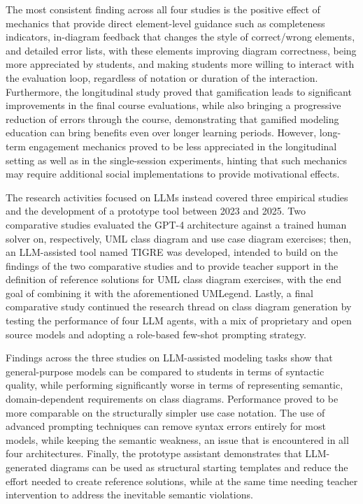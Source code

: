 The most consistent finding across all four studies is the positive effect of mechanics that provide direct element-level guidance such as completeness indicators, in-diagram feedback that changes the style of correct/wrong elements, and detailed error lists, with these elements improving diagram correctness, being more appreciated by students, and making students more willing to interact with the evaluation loop, regardless of notation or duration of the interaction. Furthermore, the longitudinal study proved that gamification leads to significant improvements in the final course evaluations, while also bringing a progressive reduction of errors through the course, demonstrating that gamified modeling education can bring benefits even over longer learning periods. However, long-term engagement mechanics proved to be less appreciated in the longitudinal setting as well as in the single-session experiments, hinting that such mechanics may require additional social implementations to provide motivational effects.

The research activities focused on LLMs instead covered three empirical studies and the development of a prototype tool between 2023 and 2025. Two comparative studies evaluated the GPT-4 architecture against a trained human solver on, respectively, UML class diagram and use case diagram exercises; then, an LLM-assisted tool named TIGRE was developed, intended to build on the findings of the two comparative studies and to provide teacher support in the definition of reference solutions for UML class diagram exercises, with the end goal of combining it with the aforementioned UMLegend. Lastly, a final comparative study continued the research thread on class diagram generation by testing the performance of four LLM agents, with a mix of proprietary and open source models and adopting a role-based few-shot prompting strategy.

Findings across the three studies on LLM-assisted modeling tasks show that general-purpose models can be compared to students in terms of syntactic quality, while performing significantly worse in terms of representing semantic, domain-dependent requirements on class diagrams. Performance proved to be more comparable on the structurally simpler use case notation. The use of advanced prompting techniques can remove syntax errors entirely for most models, while keeping the semantic weakness, an issue that is encountered in all four architectures. Finally, the prototype assistant demonstrates that LLM-generated diagrams can be used as structural starting templates and reduce the effort needed to create reference solutions, while at the same time needing teacher intervention to address the inevitable semantic violations.

